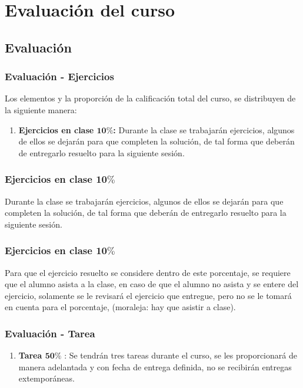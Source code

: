 \documentclass[12pt]{beamer}
\begin{document}
\section{Evaluación del curso}
\subsection{Evaluación}

\begin{frame}
\frametitle{Evaluación - Ejercicios}
Los elementos y la proporción de la calificación total del curso, se distribuyen de la siguiente manera:
\begin{enumerate}[<+->]
\item \textbf{Ejercicios en clase $\mathbf{10\%}$:} Durante la clase se trabajarán ejercicios, algunos de ellos se dejarán para que completen la solución, de tal forma que deberán de entregarlo resuelto para la siguiente sesión.
\\
\bigskip
\pause
\seti
\end{enumerate}
\end{frame}
\begin{frame}
\frametitle{Ejercicios en clase $\mathbf{10\%}$}
Durante la clase se trabajarán ejercicios, algunos de ellos se dejarán para que completen la solución, de tal forma que deberán de entregarlo resuelto para la siguiente sesión.
\end{frame}
\begin{frame}
\frametitle{Ejercicios en clase $\mathbf{10\%}$}
Para que el ejercicio resuelto se considere dentro de este porcentaje, se requiere que el alumno asista a la clase, en caso de que el alumno no asista y se entere del ejercicio, solamente se le revisará el ejercicio que entregue, pero no se le tomará en cuenta para el porcentaje, (moraleja: hay que asistir a clase).
\end{frame}
\begin{frame}
\frametitle{Evaluación - Tarea}
\begin{enumerate}[<+->]    
\conti
\item \textbf{Tarea $\mathbf{50\%}$} : Se tendrán tres tareas durante el curso, se les proporcionará de manera adelantada y con fecha de entrega definida, no se recibirán entregas extemporáneas.
\seti
\end{enumerate}
\end{frame}
\end{document}
